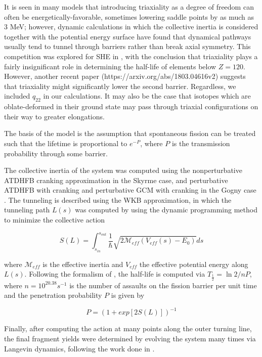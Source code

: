 It is seen in many models that introducing triaxiality as a degree of freedom can often be energetically-favorable, sometimes lowering saddle points by as much as 3 MeV; however, dynamic calculations in which the collective inertia is considered together with the potential energy surface have found that dynamical pathways usually tend to tunnel through barriers rather than break axial symmetry. This competition was explored for SHE in \cite{Gherghescu1999}, with the conclusion that triaxiality plays a fairly insignificant role in determining the half-life of elements below $Z=120$. However, another recent paper (https://arxiv.org/abs/1803.04616v2) suggests that triaxiality might significantly lower the second barrier. Regardless, we included $q_{22}$ in our calculations. It may also be the case that isotopes which are oblate-deformed in their ground state may pass through triaxial configurations on their way to greater elongations.

The basis of the model is the assumption that spontaneous fission can be treated such that the lifetime is proportional to $e^{-P}$, where $P$ is the transmission probability through some barrier.

The collective inertia of the system was computed using the nonperturbative ATDHFB cranking approximation in the Skyrme case, and perturbative ATDHFB with cranking and perturbative GCM with cranking in the Gogny case \cite{Baran2011}. The tunneling is described using the WKB approximation, in which the tunneling path $L(s)$ was computed by using the dynamic programming method to minimize the collective action

\begin{equation}
S(L) = \int_{s_{in}}^{s_{out}} \frac{1}{\hbar}\sqrt{2\mathcal{M}_{eff}\left(V_{eff}(s)-E_0\right)}ds
\end{equation}

\noindent where $\mathcal{M}_{eff}$ is the effective inertia and $V_{eff}$ the effective potential energy along $L(s)$. Following the formalism of \cite{Sadhukhan2013}, the half-life is computed via $T_{\frac{1}{2}} = \ln 2/nP$, where $n=10^{20.38}s^{-1}$ is the number of assaults on the fission barrier per unit time and the penetration probability $P$ is given by

\begin{equation}
P = (1 + exp[2S(L)])^{-1}
\end{equation}

\noindent Finally, after computing the action at many points along the outer turning line, the final fragment yields were determined by evolving the system many times via Langevin dynamics, following the work done in \cite{Sadhukhan2016}.
